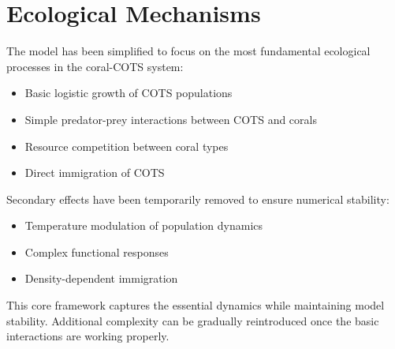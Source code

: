 \section{Ecological Mechanisms}

The model has been simplified to focus on the most fundamental ecological processes in the coral-COTS system:

\begin{itemize}
    \item Basic logistic growth of COTS populations
    \item Simple predator-prey interactions between COTS and corals
    \item Resource competition between coral types
    \item Direct immigration of COTS
\end{itemize}

Secondary effects have been temporarily removed to ensure numerical stability:

\begin{itemize}
    \item Temperature modulation of population dynamics
    \item Complex functional responses
    \item Density-dependent immigration
\end{itemize}

This core framework captures the essential dynamics while maintaining model stability. Additional complexity can be gradually reintroduced once the basic interactions are working properly.
